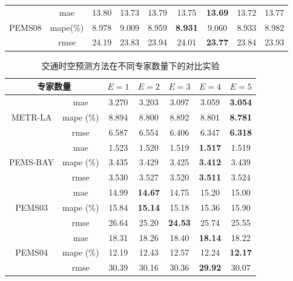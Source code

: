 \begin{table}[t!]
{\begin{tabular}{cc|ccccccc}
             \midrule
             \multirow{3}{*}{{PEMS08}} 
             & mae & 13.80 & 13.73 & 13.79 & 13.75 & \textbf{13.69} & 13.72 & 13.77 \\
             & mape(\%) & 8.978 & 9.009 & 8.959 & \textbf{8.931} & 9.060 & 8.933 & 8.982 \\
             & rmse & 24.19 & 23.83 & 23.94 & 24.01 & \textbf{23.77} & 23.84 & 23.93 \\

             \bottomrule
        \end{tabular}
    }
    
\end{table}

\begin{table}[t!]
    \centering
    \caption{交通时空预测方法在不同专家数量下的对比实验}
    \label{tab:parasen-expertNum}
        \begin{tabular}{cc|ccccc}
             \toprule
             \multicolumn{2}{c|}{\textbf{专家数量}} & $E=1$ & $E=2$ & $E=3$ & $E=4$ & $E=5$ \\
             \midrule
             \multirow{3}{*}{METR-LA} 
             & mae & 3.270 & 3.203 & 3.097 & 3.059 & \textbf{3.054} \\
             & mape (\%) & 8.894 & 8.800 & 8.892 & 8.801 & \textbf{8.781} \\
             & rmse & 6.587 & 6.554 & 6.406 & 6.347 & \textbf{6.318} \\
             
             \midrule
             \multirow{3}{*}{{PEMS-BAY}} 
             & mae & 1.523 & 1.520 & 1.519 & \textbf{1.517} & 1.519 \\
             & mape (\%) & 3.435 & 3.429 & 3.425 & \textbf{3.412} & 3.439 \\
             & rmse & 3.530 & 3.527 & 3.520 & \textbf{3.511} & 3.524 \\

             \midrule
             \multirow{3}{*}{{PEMS03}} 
             & mae & 14.99 & \textbf{14.67} & 14.75 & 15.20 & 15.00 \\
             & mape (\%) & 15.84 & \textbf{15.14} & 15.18 & 15.36 & 15.90 \\
             & rmse & 26.64 & 25.20 & \textbf{24.53} & 25.74 & 25.55 \\

             \midrule
             \multirow{3}{*}{{PEMS04}} 
             & mae & 18.31 & 18.26 & 18.40 & \textbf{18.14} & 18.22 \\
             & mape (\%) & 12.19 & 12.43 & 12.57 & 12.24 & \textbf{12.17} \\
             & rmse & 30.39 & 30.16 & 30.36 & \textbf{29.92} & 30.07 \\


\end{tabular}
\end{table}
